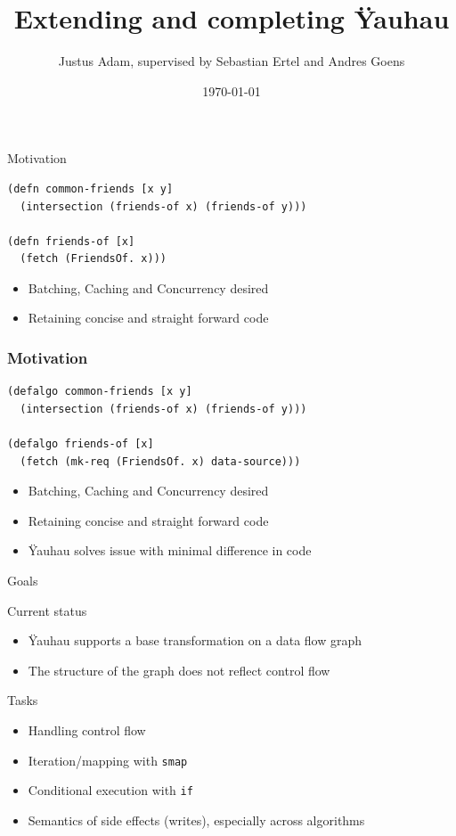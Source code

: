 \documentclass[utf8x,10pt,aspectratio=169]{beamer}
\title{Extending and completing Ÿauhau}
\author{Justus Adam, supervised by Sebastian Ertel and Andres Goens}
\date{\today}
\begin{document}
\normalsize
\maketitle

\begin{frame}[fragile]{Motivation}
	
\begin{verbatim}
(defn common-friends [x y]
  (intersection (friends-of x) (friends-of y)))

(defn friends-of [x]
  (fetch (FriendsOf. x)))
\end{verbatim}
\pause
\begin{itemize}[<+->]
	\item Batching, Caching and Concurrency desired
	\item Retaining concise and straight forward code
\end{itemize}

\end{frame}
\addtocounter{framenumber}{-1}
\begin{frame}[fragile]
	\frametitle{Motivation}
	
\begin{verbatim}
(defalgo common-friends [x y]
  (intersection (friends-of x) (friends-of y)))

(defalgo friends-of [x]
  (fetch (mk-req (FriendsOf. x) data-source)))
\end{verbatim}
\begin{itemize}
	\item Batching, Caching and Concurrency desired
	\item Retaining concise and straight forward code
	\item Ÿauhau solves issue with minimal difference in code
\end{itemize}

\end{frame}

\begin{frame}{Goals}
	\pause
	\begin{block}{Current status}
		\begin{itemize}[<+->]
			\item Ÿauhau supports a base transformation on a data flow graph
			\item The structure of the graph does not reflect control flow
		\end{itemize}
	\end{block}
	\pause
	\begin{block}{Tasks}
		\begin{itemize}[<+->]
			\item Handling control flow
			\item Iteration/mapping with \texttt{smap}
			\item Conditional execution with \texttt{if}
			\item Semantics of side effects (writes), especially across algorithms
		\end{itemize}
	\end{block}
\end{frame}
\end{document}
